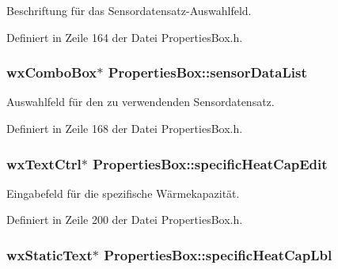 Beschriftung für das Sensordatensatz-\/\-Auswahlfeld. 



Definiert in Zeile 164 der Datei Properties\-Box.\-h.

\hypertarget{classPropertiesBox_afc9329945c39f48e441c410b0ff3d9fa}{
\subsubsection[{sensor\-Data\-List}]{\setlength{\rightskip}{0pt plus 5cm}wx\-Combo\-Box$\ast$ Properties\-Box\-::sensor\-Data\-List\hspace{0.3cm}{\ttfamily [private]}}}\label{classPropertiesBox_afc9329945c39f48e441c410b0ff3d9fa}


Auswahlfeld für den zu verwendenden Sensordatensatz. 



Definiert in Zeile 168 der Datei Properties\-Box.\-h.

\hypertarget{classPropertiesBox_a7058b344520a2d9ba42fe9e9c1080faa}{
\subsubsection[{specific\-Heat\-Cap\-Edit}]{\setlength{\rightskip}{0pt plus 5cm}wx\-Text\-Ctrl$\ast$ Properties\-Box\-::specific\-Heat\-Cap\-Edit\hspace{0.3cm}{\ttfamily [private]}}}\label{classPropertiesBox_a7058b344520a2d9ba42fe9e9c1080faa}


Eingabefeld für die spezifische Wärmekapazität. 



Definiert in Zeile 200 der Datei Properties\-Box.\-h.

\hypertarget{classPropertiesBox_ad49b95cb856e5f18d6717fc99ccd7b0b}{
\subsubsection[{specific\-Heat\-Cap\-Lbl}]{\setlength{\rightskip}{0pt plus 5cm}wx\-Static\-Text$\ast$ Properties\-Box\-::specific\-Heat\-Cap\-Lbl\hspace{0.3cm}{\ttfamily [private]}}}\label{classPropertiesBox_ad49b95cb856e5f18d6717fc99ccd7b0b}


